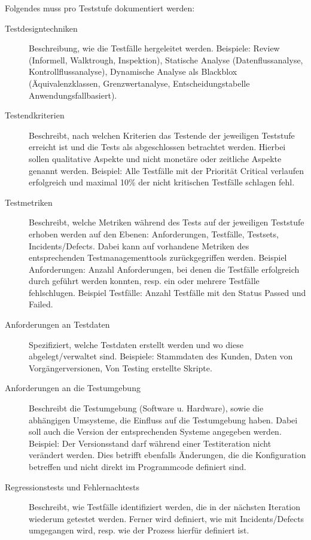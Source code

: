 Folgendes muss pro Teststufe dokumentiert werden:
\begin{description}
	\item[Testdesigntechniken] Beschreibung, wie die Testfälle hergeleitet werden. Beispiele: Review (Informell, Walktrough, Inspektion), Statische Analyse (Datenflussanalyse, Kontrollflussanalyse), Dynamische Analyse als Blackblox (Äquivalenzklassen, Grenzwertanalyse, Entscheidungstabelle Anwendungsfallbasiert).
	
	\item[Testendkriterien] Beschreibt, nach welchen Kriterien das Testende der jeweiligen Teststufe erreicht ist und die Tests als abgeschlossen betrachtet werden. Hierbei sollen qualitative Aspekte und nicht monetäre oder zeitliche Aspekte genannt werden. Beispiel: Alle Testfälle mit der Priorität Critical verlaufen erfolgreich und maximal 10\% der nicht kritischen Testfälle schlagen fehl.
	
	\item[Testmetriken] Beschreibt, welche Metriken während des Tests auf der jeweiligen Teststufe erhoben werden auf den Ebenen: Anforderungen, Testfälle, Testsets, Incidents/Defects. Dabei kann auf vorhandene Metriken des entsprechenden Testmanagementtools zurückgegriffen werden. Beispiel Anforderungen: Anzahl Anforderungen, bei denen die Testfälle erfolgreich durch geführt werden konnten, resp. ein oder mehrere Testfälle fehlschlugen. Beispiel Testfälle: Anzahl Testfälle mit den Status Passed und Failed.
	
	\item[Anforderungen an Testdaten] Spezifiziert, welche Testdaten erstellt werden und wo diese abgelegt/verwaltet sind. Beispiele: Stammdaten des Kunden, Daten von Vorgängerversionen, Von Testing erstellte Skripte.
	
	\item[Anforderungen an die Testumgebung] Beschreibt die Testumgebung (Software u. Hardware), sowie die abhängigen Umsysteme, die Einfluss auf die Testumgebung haben. Dabei soll auch die Version der entsprechenden Systeme angegeben werden. Beispiel: Der Versionsstand darf während einer Testiteration nicht verändert werden. Dies betrifft ebenfalls Änderungen, die die Konfiguration betreffen und nicht direkt im Programmcode definiert sind.
	
	\item[Regressionstests und Fehlernachtests] Beschreibt, wie Testfälle identifiziert werden, die in der nächsten Iteration wiederum getestet werden. Ferner wird definiert, wie mit Incidents/Defects umgegangen wird, resp. wie der Prozess hierfür definiert ist.
	
\end{description}

